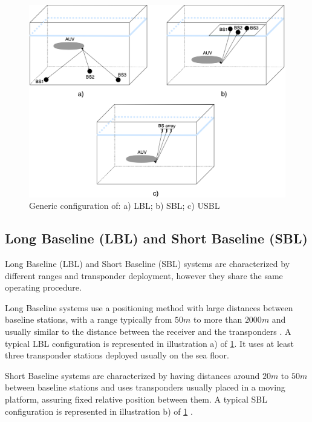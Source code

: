 \begin{figure}[!htbp]
	\centering
	\includegraphics[width=1\textwidth]{figures/lblsblusbl}
	\caption{Generic configuration of: a) LBL; b) SBL; c) USBL}
	\label{fig:lblsblusbl}
\end{figure}

\subsection{Long Baseline (LBL) and Short Baseline (SBL)}

Long Baseline (LBL) and Short Baseline (SBL) systems are characterized by different ranges and transponder deployment, however they share the same operating procedure.

Long Baseline systems use a positioning method with large distances between baseline stations, with a range typically from $50m$ to more than $2000m$ and usually similar to the distance between the receiver and the transponders \cite{crosscorr}. A typical LBL configuration is represented in illustration a) of \ref{fig:lblsblusbl}. It uses at least three transponder stations deployed usually on the sea floor.

Short Baseline systems are characterized by having distances around $20m$ to $50m$ between baseline stations \cite{survey-tech-chall} and uses transponders usually placed in a moving platform, assuring fixed relative position between them. A typical SBL configuration is represented in illustration b) of \ref{fig:lblsblusbl} \cite{leassquare-lbl}.

